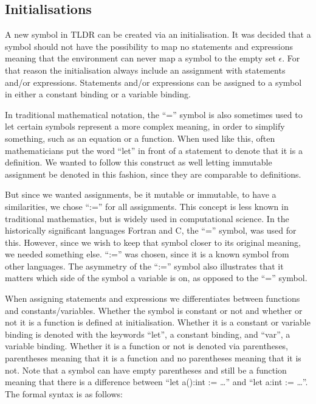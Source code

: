 \subsection{Initialisations}\label{subsec:initialisations}
A new symbol in TLDR can be created via an initialisation. It was decided that a symbol should not have the possibility to map no statements and expressions meaning that the environment can never map a symbol to the empty set $\epsilon$. For that reason the initialisation always include an assignment with statements and/or expressions. Statements and/or expressions can be assigned to a symbol in either a constant binding or a variable binding.

In traditional mathematical notation, the \enquote{=} symbol is also sometimes used to let certain symbols represent a more complex meaning, in order to simplify something, such as an equation or a function. When used like this, often mathematicians put the word \enquote{let} in front of a statement to denote that it is a definition. We wanted to follow this construct as well letting immutable assignment be denoted in this fashion, since they are comparable to definitions. 

But since we wanted assignments, be it mutable or immutable, to have a similarities, we chose \enquote{:=} for all assignments. This concept is less known in traditional mathematics, but is widely used in computational science. In the historically significant languages Fortran and C, the \enquote{=} symbol, was used for this. However, since we wish to keep that symbol closer to its original meaning, we needed something else. \enquote{:=} was chosen, since it is a known symbol from other languages. The asymmetry of the \enquote{:=} symbol also illustrates that it matters which side of the symbol a variable is on, as opposed to the \enquote{=} symbol.

When assigning statements and expressions we differentiates between functions and constants/variables. Whether the symbol is constant or not and whether or not it is a function is defined at initialisation. Whether it is a constant or variable binding is denoted with the keywords \enquote{let}, a constant binding, and \enquote{var}, a variable binding. Whether it is a function or not is denoted via parentheses, parentheses meaning that it is a function and no parentheses meaning that it is not. Note that a symbol can have empty parentheses and still be a function meaning that there is a difference between \enquote{let a():int := \dots} and \enquote{let a:int := \dots}. The formal syntax is as follows: 

